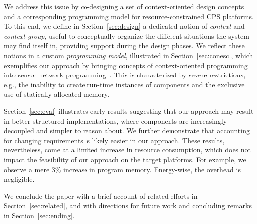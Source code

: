 We address this issue by co-designing a set of context-oriented design
concepts and a corresponding programming model for
resource-constrained CPS platforms. To this end, we define in
Section~\ref{sec:design} a dedicated notion of \emph{context} and
\emph{context group}, useful to conceptually organize the different
situations the system may find itself in, providing support during the
design phases. We reflect these notions in a custom \emph{programming
  model}, illustrated in Section~\ref{sec:conesc}, which exemplifies
our approach by bringing concepts of context-oriented
programming~\cite{cop} into sensor network
programming~\cite{tinyos}. This is characterized by severe
restrictions, e.g., the inability to create run-time instances of
components and the exclusive use of statically-allocated memory.

Section~\ref{sec:eval} illustrates early results suggesting that our
approach may result in better structured implementations, where
components are increasingly decoupled and simpler to reason about. We
further demonstrate that accounting for changing requirements is
likely easier in our approach. These results, nevertheless, come at a
limited increase in resource consumption, which does not impact the
feasibility of our approach on the target platforms. For example, we
observe a mere 3\% increase in program memory. Energy-wise, the
overhead is negligible.

We conclude the paper with a brief account of related efforts in
Section~\ref{sec:related}, and with directions for future work and
concluding remarks in Section~\ref{sec:ending}.







